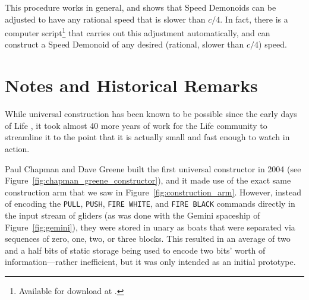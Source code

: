 This procedure works in general, and shows that Speed Demonoids can be adjusted to have any rational speed that is slower than $c/4$. In fact, there is a computer script\footnote{Available for download at .} that carries out this adjustment automatically, and can construct a Speed Demonoid of any desired (rational, slower than $c/4$) speed.


\section{Notes and Historical Remarks}\label{sec:universal_construction_history}

While universal construction has been known to be possible since the early days of Life \cite{Wain74,BCG82}, it took almost 40 more years of work for the Life community to streamline it to the point that it is actually small and fast enough to watch in action.

Paul Chapman and Dave Greene built the first universal constructor in 2004 (see Figure~\ref{fig:chapman_greene_constructor}), and it made use of the exact same construction arm that we saw in Figure~\ref{fig:construction_arm}. However, instead of encoding the \texttt{PULL}, \texttt{PUSH}, \texttt{FIRE WHITE}, and \texttt{FIRE BLACK} commands directly in the input stream of gliders (as was done with the Gemini spaceship of Figure~\ref{fig:gemini}), they were stored in unary as boats that were separated via sequences of zero, one, two, or three blocks. This resulted in an average of two and a half bits of static storage being used to encode two bits' worth of information---rather inefficient, but it was only intended as an initial prototype.

